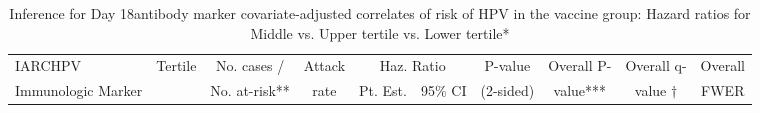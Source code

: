 \begin{longtable}{lccccccccc}
\caption{Inference for Day 18antibody marker covariate-adjusted correlates of risk of HPV in the vaccine group: Hazard ratios for Middle vs. Upper tertile vs. Lower tertile*} \\ 
   \hline
 
         \multicolumn{1}{l}{IARCHPV} & \multicolumn{1}{c}{Tertile}   & \multicolumn{1}{c}{No. cases /}   & \multicolumn{1}{c}{Attack}   & \multicolumn{2}{c}{Haz. Ratio}                     & \multicolumn{1}{c}{P-value}   & \multicolumn{1}{c}{Overall P-}      & \multicolumn{1}{c}{Overall q-}   & \multicolumn{1}{c}{Overall} \\ 
         \multicolumn{1}{l}{Immunologic Marker}            & \multicolumn{1}{c}{}          & \multicolumn{1}{c}{No. at-risk**} & \multicolumn{1}{c}{rate}   & \multicolumn{1}{c}{Pt. Est.} & \multicolumn{1}{c}{95\% CI} & \multicolumn{1}{c}{(2-sided)} & \multicolumn{1}{c}{value***} & \multicolumn{1}{c}{value $\dagger$} & \multicolumn{1}{c}{FWER} \\ 
         \hline
 

\end{longtable}
